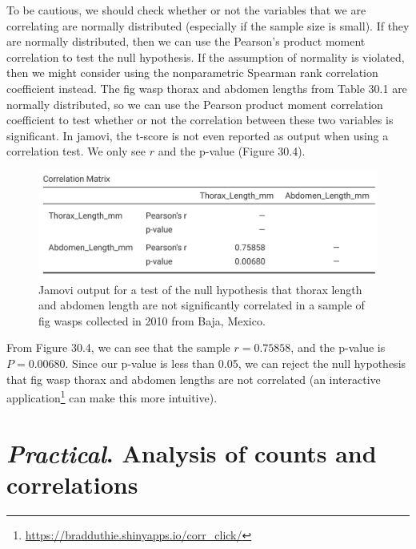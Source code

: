 \documentclass[
]{scrbook}
\begin{document}
To be cautious, we should check whether or not the variables that we are correlating are normally distributed (especially if the sample size is small).
If they are normally distributed, then we can use the Pearson's product moment correlation to test the null hypothesis.
If the assumption of normality is violated, then we might consider using the nonparametric Spearman rank correlation coefficient instead.
The fig wasp thorax and abdomen lengths from Table 30.1 are normally distributed, so we can use the Pearson product moment correlation coefficient to test whether or not the correlation between these two variables is significant.
In jamovi, the t-score is not even reported as output when using a correlation test.
We only see \(r\) and the p-value (Figure 30.4).

\begin{figure}
\includegraphics[width=1\linewidth]{img/Jamovi_correlation_output} \caption{Jamovi output for a test of the null hypothesis that thorax length and abdomen length are not significantly correlated in a sample of fig wasps collected in 2010 from Baja, Mexico.}\label{fig:unnamed-chunk-150}
\end{figure}

From Figure 30.4, we can see that the sample \(r = 0.75858\), and the p-value is \(P = 0.00680\).
Since our p-value is less than 0.05, we can reject the null hypothesis that fig wasp thorax and abdomen lengths are not correlated (an interactive application\footnote{\url{https://bradduthie.shinyapps.io/corr_click/}} can make this more intuitive).

\hypertarget{Chapter_31}{%
\chapter{\texorpdfstring{\emph{Practical}. Analysis of counts and correlations}{Practical. Analysis of counts and correlations}}\label{Chapter_31}}
\end{document}
